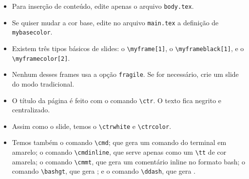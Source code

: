 \begin{frame}[fragile]

  \begin{itemize}
    \item Para inserção de conteúdo, edite apenas o arquivo \texttt{body.tex}.
    \item Se quiser mudar a cor base, edite no arquivo \texttt{main.tex} a
    definição de \texttt{mybasecolor}.
    \item Existem três tipos básicos de slides: o \verb+\myframe[1]+, o
    \verb+\myframeblack[1]+, e o \verb+\myframecolor[2]+.
    \item Nenhum desses frames usa a opção \verb+fragile+. Se for necessário,
    crie um slide do modo tradicional.
  \end{itemize}
\end{frame}


\begin{frame}[fragile]

  \begin{itemize}
    \item O título da página é feito com o comando \verb+\ctr+. O texto fica
      negrito e centralizado.
    \item Assim como o slide, temos o \verb+\ctrwhite+ e \verb+\ctrcolor+.
    \item Temos também o comando \verb+\cmd+; que gera um comando do terminal em
      amarelo; o comando \verb+\cmdinline+, que serve apenas como um \verb+\tt+
      de cor amarela; o comando \verb+\cmmt+, que gera um comentário inline no
      formato bash; o comando \verb+\bashgt+, que gera \bashgt; e o comando
      \verb+\ddash+, que gera \ddash.
  \end{itemize}
\end{frame}
